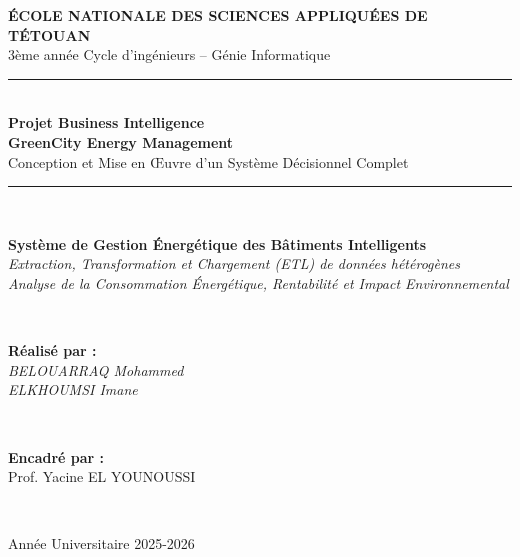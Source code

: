 \documentclass[12pt,a4paper]{report}
\begin{document}

\begin{titlepage}
    \centering
    \vspace*{1cm}
    
    {\Large \textbf{ÉCOLE NATIONALE DES SCIENCES APPLIQUÉES DE TÉTOUAN}}\\[0.5cm]
    {\large 3ème année Cycle d'ingénieurs -- Génie Informatique}\\[2cm]
    
    {\color{primarycolor}\rule{\linewidth}{0.5mm}}\\[0.4cm]
    {\huge \textbf{Projet Business Intelligence}}\\[0.3cm]
    {\LARGE \textbf{GreenCity Energy Management}}\\[0.3cm]
    {\Large Conception et Mise en Œuvre d'un Système Décisionnel Complet}\\[0.3cm]
    {\color{primarycolor}\rule{\linewidth}{0.5mm}}\\[2cm]
    
    \begin{minipage}{0.8\textwidth}
        \centering
        \textbf{\large Système de Gestion Énergétique des Bâtiments Intelligents}\\[0.5cm]
        \textit{Extraction, Transformation et Chargement (ETL) de données hétérogènes}\\
        \textit{Analyse de la Consommation Énergétique, Rentabilité et Impact Environnemental}
    \end{minipage}\\[2cm]
    
    \begin{minipage}{0.8\textwidth}
        \begin{flushleft}
            \textbf{Réalisé par :}\\
            \textit{BELOUARRAQ Mohammed}\\
            \textit{ELKHOUMSI Imane}
        \end{flushleft}
    \end{minipage}\\[1cm]
    
    \begin{minipage}{0.8\textwidth}
        \begin{flushleft}
            \textbf{Encadré par :}\\
            Prof. Yacine EL YOUNOUSSI
        \end{flushleft}
    \end{minipage}\\[2cm]
    
    \vfill
    
    {\large Année Universitaire 2025-2026}
    
\end{titlepage}
\end{document}
